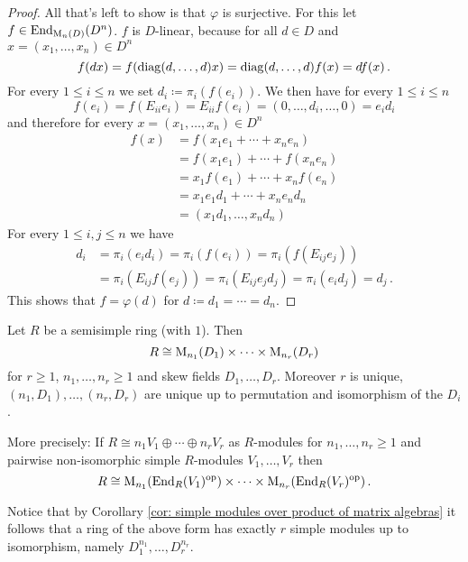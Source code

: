\begin{proof}
  All that’s left to show is that $\varphi$ is surjective.
  For this let $f \in \operatorname{End}_{\operatorname{M}_n(D)}(D^n)$.
  $f$ is $D$-linear, because for all $d \in D$ and $x = (x_1, \dotsc, x_n) \in D^n$
  \[
      f(dx)
    = f( \operatorname{diag}(d, \dotsc, d) x)
    = \operatorname{diag}(d, \dotsc, d) f(x)
    = d f(x) \,.
  \]
  For every $1 \leq i \leq n$ we set $d_i \coloneqq \pi_i(f(e_i))$.
  We then have for every $1 \leq i \leq n$
  \[
      f(e_i)
    = f(E_{ii} e_i)
    = E_{ii} f(e_i)
    = (0, \dotsc, d_i, \dotsc, 0)
    = e_i d_i 
  \]
  and therefore for every $x = (x_1, \dotsc, x_n) \in D^n$
  \begin{align*}
        f(x)
    &=  f(x_1 e_1 + \dotsb + x_n e_n)       \\
    &=  f(x_1 e_1) + \dotsb + f(x_n e_n)    \\
    &=  x_1 f(e_1) + \dotsb + x_n f(e_n)    \\
    &=  x_1 e_1 d_1 + \dotsb + x_n e_n d_n  \\
    &=  (x_1 d_1, \dotsc, x_n d_n)
  \end{align*}
  For every $1 \leq i,j \leq n$ we have
  \begin{align*}
        d_i
    &=  \pi_i(e_i d_i)
     =  \pi_i(f(e_i))
     =  \pi_i(f(E_{ij} e_j)) \\
    &=  \pi_i(E_{ij} f(e_j))
     =  \pi_i(E_{ij} e_j d_j)
     =  \pi_i(e_i d_j)
     =  d_j \,.
  \end{align*}   
  This shows that $f = \varphi(d)$ for $d \coloneqq d_1 = \dotsb = d_n$.
\end{proof}


\begin{thrm}
  Let $R$ be a semisimple ring (with $1$). Then
  \[
    R \cong \operatorname{M}_{n_1}(D_1) \times \dotsb \times  \operatorname{M}_{n_r}(D_r)
  \]
  for $r \geq 1$, $n_1, \dotsc, n_r \geq 1$ and skew fields $D_1, \dotsc, D_r$.
  Moreover $r$ is unique, $(n_1,D_1), \dotsc, (n_r,D_r)$ are unique up to permutation and isomorphism of the $D_i$.
  
  More precisely:
  If $R \cong n_1 V_1 \oplus \dotsb \oplus n_r V_r$ as $R$-modules for $n_1, \dotsc, n_r \geq 1$ and pairwise non-isomorphic simple $R$-modules $V_1, \dotsc, V_r$ then
  \[
    R \cong \operatorname{M}_{n_1}(\operatorname{End}_R(V_1)^{\mathrm{op}}) \times \dotsb \times \operatorname{M}_{n_r}(\operatorname{End}_R(V_r)^{\mathrm{op}}) \,.
  \]
\end{thrm}


Notice that by Corollary \ref{cor: simple modules over product of matrix algebras} it follows that a ring of the above form has exactly $r$ simple modules up to isomorphism, namely $D_1^{n_1}, \dotsc, D_r^{n_r}$.


